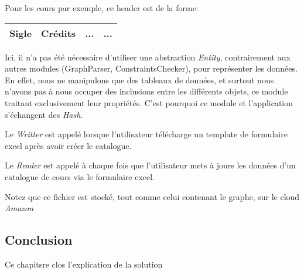 Pour les cours par exemple, ce header est de la forme:
\begin{table}[H]
\centering
\begin{tabular}{| c | c | c | c |}
\hline
\textbf{Sigle} & \textbf{Crédits} & \textbf{...} & \textbf{...}\\
\hline
\end{tabular}  
\end{table}

Ici, il n'a pas été nécessaire d'utiliser une abstraction \textit{Entity}, contrairement aux autres modules (GraphParser, ConstraintsChecker), pour représenter les données. En effet, nous ne manipulons que des tableaux de données, et surtout nous n'avons pas à nous occuper des inclusions entre les différents objets, ce module traitant exclusivement leur propriétés. C'est pourquoi ce module et l'application s'échangent des \textit{Hash}. 


Le \textit{Writter} est appelé lorsque l'utilisateur télécharge un template de formulaire excel après avoir créer le catalogue. 

Le \textit{Reader} est appelé à chaque fois que l'utilisateur mets à jours  les données d'un catalogue de cours via le formulaire excel. 


Notez que ce fichier est stocké, tout comme celui contenant le graphe, sur le cloud \textit{Amazon}

\subsection{Conclusion}

Ce chapitsre clos l'explication de la solution
